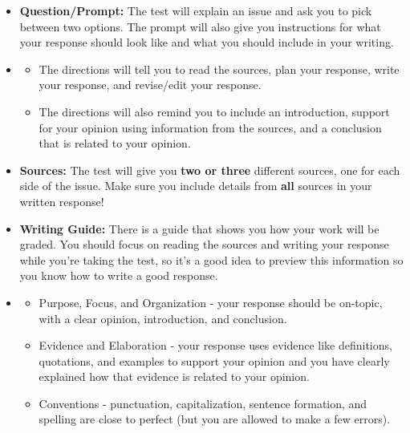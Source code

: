 \documentclass[12pt]{article}
\begin{document}
\vspace{1em}

\begin{tcolorbox}[colframe=black!60, colback=white, 
coltitle=black, colbacktitle=black!15, fonttitle=\bfseries\Large, 
title=What does the Writing Task Look Like?, halign title=center, left=10pt, right=10pt, top=10pt, bottom=15pt]

\begin{itemize}
    \item \textbf{Question/Prompt:} The test will explain an issue and ask you to pick between two options. The prompt will also give you instructions for what your response should look like and what you should include in your writing.
    \item
    \begin{itemize}
        \item The directions will tell you to read the sources, plan your response, write your response, and revise/edit your response.
        \item The directions will also remind you to include an introduction, support for your opinion using information from the sources, and a conclusion that is related to your opinion.
    \end{itemize}
    \item \textbf{Sources:} The test will give you \textbf{two or three} different sources, one for each side of the issue. Make sure you include details from \textbf{all} sources in your written response!
    \item \textbf{Writing Guide:} There is a guide that shows you how your work will be graded. You should focus on reading the sources and writing your response while you're taking the test, so it's a good idea to preview this information so you know how to write a good response.
   
   \item \begin{itemize}
        \item Purpose, Focus, and Organization - your response should be on-topic, with a clear opinion, introduction, and conclusion. 
        \item Evidence and Elaboration - your response uses evidence like definitions, quotations, and examples to support your opinion and you have clearly explained how that evidence is related to your opinion. 
        \item Conventions - punctuation, capitalization, sentence formation, and spelling are close to perfect (but you are allowed to make a few errors).
    \end{itemize}
    \end{itemize}






\end{tcolorbox}
\end{document}

